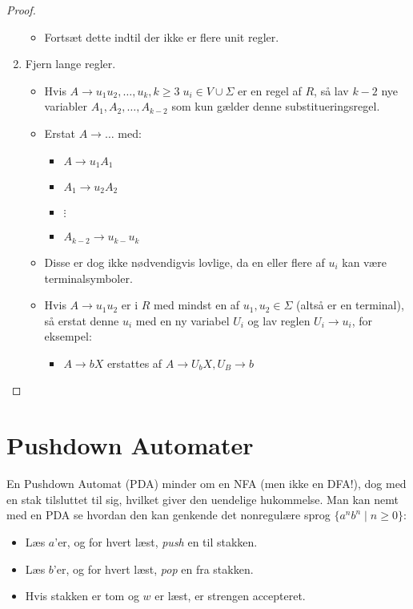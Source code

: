\begin{proof}
\begin{enumerate}
\begin{itemize}
			      \item Fortsæt dette indtil der ikke er flere unit regler.
		      \end{itemize}
		\item Fjern lange regler.
		      \begin{itemize}
			      \item Hvis $A \rightarrow u_{1}u_{2}, \ldots, u_{k}, k \ge 3 \; u_{i} \in V \cup \Sigma$ er en regel af $R$, så lav $k-2$ nye variabler $A_{1}, A_{2}, \ldots, A_{k-2}$ som kun gælder denne substitueringsregel.
			      \item Erstat $A \rightarrow \ldots$ med:
			            \begin{itemize}
				            \item $A \rightarrow u_{1}A_{1}$
				            \item $A_{1} \rightarrow u_{2}A_{2}$
				            \item $\vdots$
				            \item $A_{k-2} \rightarrow u_{k-}u_{k}$
			            \end{itemize}
			      \item Disse er dog ikke nødvendigvis lovlige, da en eller flere af $u_{i}$ kan være terminalsymboler.
			      \item Hvis $A \rightarrow u_{1}u_{2}$ er i $R$ med mindst en af $u_{1}, u_{2} \in \Sigma$ (altså er en terminal), så erstat denne $u_{i}$ med en ny variabel $U_{i}$ og lav reglen $U_{i} \rightarrow u_{i}$, for eksempel:
			            \begin{itemize}
				            \item $A \rightarrow bX$ erstattes af $A \rightarrow U_{b}X, U_{B} \rightarrow b$
			            \end{itemize}
		      \end{itemize}
	\end{enumerate}
\end{proof}

\section{Pushdown Automater}%
\label{sec:label}

En Pushdown Automat (PDA) minder om en NFA (men ikke en DFA!), dog med en stak tilsluttet til sig, hvilket giver den uendelige hukommelse. Man kan nemt med en PDA se hvordan den kan genkende det nonregulære sprog $\{a^{n}b^{n} \mid n \ge 0\}$:
\begin{itemize}
	\item Læs $a$'er, og for hvert læst, \textit{push} en til stakken.
	\item Læs $b$'er, og for hvert læst, \textit{pop} en fra stakken.
	\item Hvis stakken er tom og $w$ er læst, er strengen accepteret.
\end{itemize}

